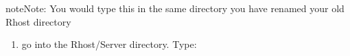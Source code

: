 \documentclass[letterpaper,10pt,english]{sphinxmanual}
\begin{document}
\begin{sphinxadmonition}{note}{Note:}
\sphinxAtStartPar
You would type this in the same directory you have renamed your old \textquotesingle{}Rhost\textquotesingle{} directory
\end{sphinxadmonition}
\begin{enumerate}
%
\item {} 
\sphinxAtStartPar
go into the Rhost/Server directory.   Type:

\begin{sphinxVerbatim}[commandchars=\\\{\}]
 
\end{sphinxVerbatim}

\end{enumerate}
\end{document}

